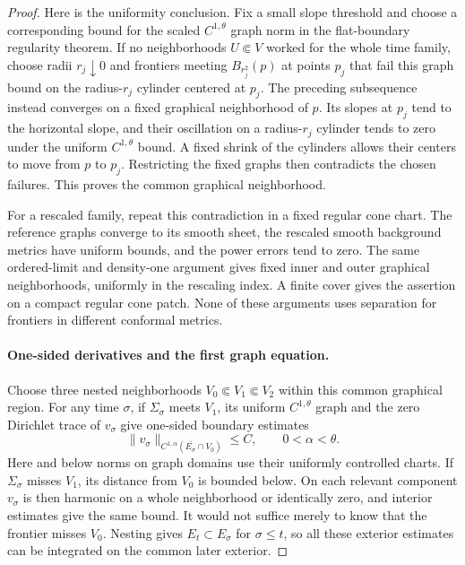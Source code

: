 \begin{proof}
Here is the uniformity conclusion. Fix a small slope threshold and
choose a corresponding bound for the scaled $C^{1,\theta}$ graph
norm in the flat-boundary regularity theorem. If no neighborhoods
$U\Subset V$ worked for the whole time family, choose radii
$r_j\downarrow0$ and frontiers meeting $B_{r_j^2}(p)$ at points
$p_j$ that fail this graph bound on the radius-$r_j$ cylinder
centered at $p_j$. The preceding subsequence instead converges on
a fixed graphical neighborhood of $p$. Its slopes at $p_j$ tend to
the horizontal slope, and their oscillation on a radius-$r_j$
cylinder tends to zero under the uniform $C^{1,\theta}$ bound.
A fixed shrink of the cylinders allows their centers to move from
$p$ to $p_j$. Restricting the fixed graphs then contradicts the
chosen failures. This proves the common graphical neighborhood.

For a rescaled family, repeat this contradiction in a fixed regular
cone chart. The reference graphs converge to its smooth sheet, the
rescaled smooth background metrics have uniform bounds, and the
power errors tend to zero. The same ordered-limit and density-one
argument gives fixed inner and outer graphical neighborhoods,
uniformly in the rescaling index. A finite cover gives the assertion
on a compact regular cone patch. None of these arguments uses
separation for frontiers in different conformal metrics.

\paragraph{One-sided derivatives and the first graph equation.}
Choose three nested neighborhoods
$V_0\Subset V_1\Subset V_2$ within this common graphical region.
For any time $\sigma$, if $\Sigma_\sigma$ meets $V_1$, its uniform
$C^{1,\theta}$ graph and the zero Dirichlet trace of $v_\sigma$ give
one-sided boundary estimates
\[
 \|v_\sigma\|_{C^{1,\alpha}(\overline{E_\sigma}\cap V_0)}\le C,
 \qquad 0<\alpha<\theta.
\]
Here and below norms on graph domains use their uniformly controlled
charts. If $\Sigma_\sigma$ misses $V_1$, its distance from $V_0$ is
bounded below. On each relevant component $v_\sigma$ is then harmonic
on a whole neighborhood or identically zero, and interior estimates
give the same bound. It would not suffice merely to know that the
frontier misses $V_0$. Nesting gives $E_t\subset E_\sigma$ for
$\sigma\le t$, so all these exterior estimates can be integrated
on the common later exterior.


\end{proof}
